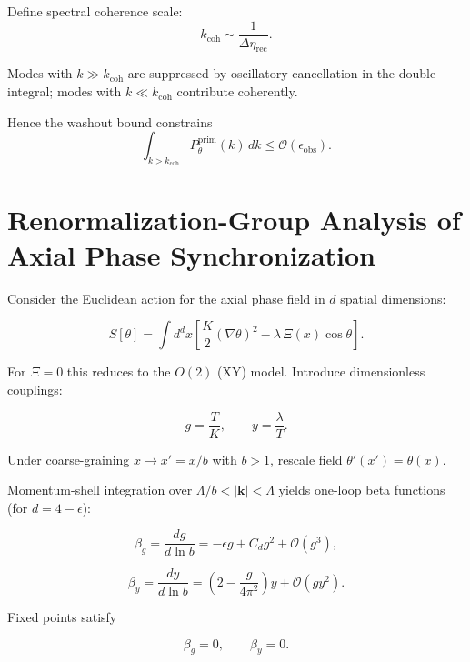 \documentclass[12pt]{article}
\begin{document}
Define spectral coherence scale:
\begin{equation}
k_{\mathrm{coh}}
\sim
\frac{1}{\Delta\eta_{\mathrm{rec}}}.
\end{equation}

Modes with $k \gg k_{\mathrm{coh}}$ are suppressed by oscillatory cancellation in the double integral; modes with $k \ll k_{\mathrm{coh}}$ contribute coherently.

Hence the washout bound constrains
\begin{equation}
\int_{k>k_{\mathrm{coh}}}
P_\theta^{\mathrm{prim}}(k)
\, dk
\le
\mathcal{O}(\epsilon_{\mathrm{obs}}).
\end{equation}

\section{Renormalization-Group Analysis of Axial Phase Synchronization}

Consider the Euclidean action for the axial phase field in $d$ spatial dimensions:

\begin{equation}
S[\theta]
=
\int d^d x
\left[
\frac{K}{2} (\nabla \theta)^2
-
\lambda \, \Xi(x) \cos \theta
\right].
\end{equation}

For $\Xi=0$ this reduces to the $O(2)$ (XY) model. Introduce dimensionless couplings:

\begin{equation}
g = \frac{T}{K},
\qquad
y = \frac{\lambda}{T}.
\end{equation}

Under coarse-graining $x \rightarrow x' = x/b$ with $b>1$, rescale field $\theta'(x')=\theta(x)$.

Momentum-shell integration over $\Lambda/b < |\mathbf{k}| < \Lambda$ yields one-loop beta functions (for $d=4-\epsilon$):

\begin{equation}
\beta_g
=
\frac{dg}{d\ln b}
=
-\epsilon g
+
C_d g^2
+
\mathcal{O}(g^3),
\end{equation}

\begin{equation}
\beta_y
=
\frac{dy}{d\ln b}
=
\left(
2-\frac{g}{4\pi^2}
\right)y
+
\mathcal{O}(gy^2).
\end{equation}

Fixed points satisfy

\begin{equation}
\beta_g=0,
\qquad
\beta_y=0.
\end{equation}
\end{document}
